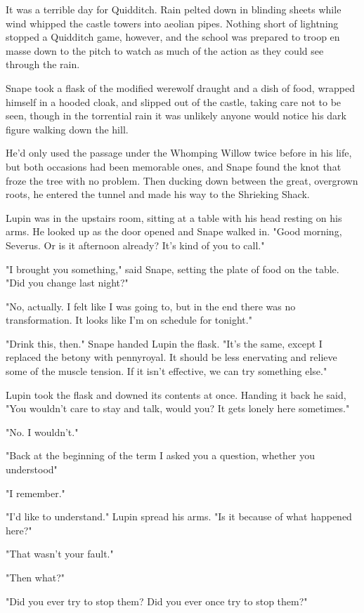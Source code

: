 It was a terrible day for Quidditch. Rain pelted down in blinding sheets while wind whipped the castle towers into aeolian pipes. Nothing short of lightning stopped a Quidditch game, however, and the school was prepared to troop en masse down to the pitch to watch as much of the action as they could see through the rain.

Snape took a flask of the modified werewolf draught and a dish of food, wrapped himself in a hooded cloak, and slipped out of the castle, taking care not to be seen, though in the torrential rain it was unlikely anyone would notice his dark figure walking down the hill.

He'd only used the passage under the Whomping Willow twice before in his life, but both occasions had been memorable ones, and Snape found the knot that froze the tree with no problem. Then ducking down between the great, overgrown roots, he entered the tunnel and made his way to the Shrieking Shack.

Lupin was in the upstairs room, sitting at a table with his head resting on his arms. He looked up as the door opened and Snape walked in. "Good morning, Severus. Or is it afternoon already? It's kind of you to call."

"I brought you something," said Snape, setting the plate of food on the table. "Did you change last night?"

"No, actually. I felt like I was going to, but in the end there was no transformation. It looks like I'm on schedule for tonight."

"Drink this, then." Snape handed Lupin the flask. "It's the same, except I replaced the betony with pennyroyal. It should be less enervating and relieve some of the muscle tension. If it isn't effective, we can try something else."

Lupin took the flask and downed its contents at once. Handing it back he said, "You wouldn't care to stay and talk, would you? It gets lonely here sometimes."

"No. I wouldn't."

"Back at the beginning of the term I asked you a question, whether you understood{\el}"

"I remember."

"I'd like to understand." Lupin spread his arms. "Is it because of what happened here?"

"That wasn't your fault."

"Then what{\el}?"

"Did you ever try to stop them? Did you ever once try to stop them?"

